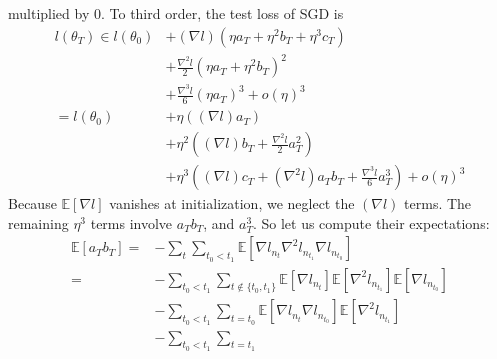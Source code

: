\documentclass[openany, notitlepage, justified]{tufte-book}
\theoremstyle{plain}
\theoremstyle{definition}
\newcommand{\wrap}[1]{\left(#1\right)}
\newcommand{\expct}[1]{\mathbb{E}\left[#1\right]}
\begin{document}
\begin{shaded}
                multiplied by $0$.
                To third order, the test loss of SGD is
                \begin{align*}
                    l(\theta_T)
                    \in
                            l(\theta_0)
                    &+     (\nabla   l)   (\eta a_T + \eta^2 b_T + \eta^3 c_T)                              \\
                    &+\frac{\nabla^2 l}{2}(\eta a_T + \eta^2 b_T             )^2                            \\
                    &+\frac{\nabla^3 l}{6}(\eta a_T                          )^3 
                     +o(\eta)^3                                                                             \\
                    =
                        l(\theta_0)
                    &+  \eta       \wrap{(\nabla l) a_T                               }                     \\
                    &+  \eta^2     \wrap{(\nabla l) b_T + \frac{\nabla^2 l}{2} a_T^2  }                     \\
                    &+  \eta^3     \wrap{(\nabla l) c_T + (\nabla^2 l) a_T b_T + \frac{\nabla^3 l}{6} a_T^3}
                     +o(\eta)^3                                                                             
                \end{align*}
                Because $\expct{\nabla l}$ vanishes at initialization, we neglect
                the $(\nabla l)$ terms.  The remaining $\eta^3$ terms involve
                $a_T b_T$, and $a_T^3$.  So let us
                compute their expectations:
                \begin{align*}
                    \expct{a_T b_T}
                        =&- \sum_{t} \sum_{t_0 < t_1}
                            \expct{\nabla l_{n_t} \nabla^2 l_{n_{t_1}} \nabla l_{n_{t_0}}}
                        \\
                        =&- \sum_{t_0 < t_1}  
                            \sum_{t \notin \{t_0, t_1\}} 
                                \expct{\nabla l_{n_t}} \expct{\nabla^2 l_{n_{t_1}}} \expct{\nabla l_{n_{t_0}}}
                        \\&- \sum_{t_0 < t_1}  
                            \sum_{t = t_0}
                                \expct{\nabla l_{n_t} \nabla l_{n_{t_0}}} \expct{\nabla^2 l_{n_{t_1}}}
                        \\&- \sum_{t_0 < t_1}  
                            \sum_{t = t_1}

\end{align*}
\end{shaded}
\end{document}
